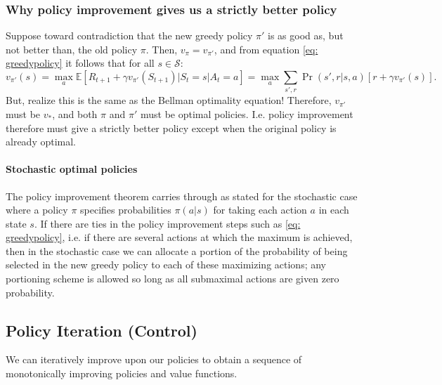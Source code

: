 \documentclass[12pt]{article}
\begin{document}
\subsubsection{Why policy improvement gives us a strictly better policy} Suppose toward contradiction that the new greedy policy $\pi'$ is as good as, but not better than, the old policy $\pi$. Then, $v_\pi = v_{\pi'}$, and from equation
\ref{eq: greedypolicy} it follows that for all $s \in \mathcal S$:
\[
  v_{\pi'}(s) = \max_a \mathbb E \left[R_{t+1} + \gamma v_{\pi'}(S_{t+1}) | S_t= s | A_t = a \right] = \max_a \sum_{s',r} \Pr(s',r|s,a)\left[r + \gamma v_{\pi'}(s)\right].
\]
But, realize this is the same as the Bellman optimality equation! Therefore, $v_{\pi'}$ must be $v_*$, and both $\pi$ and $\pi'$ must be optimal policies. I.e. policy improvement therefore must give a strictly better policy except when the original policy is already optimal.

\paragraph{Stochastic optimal policies} The policy improvement theorem carries through as stated for the stochastic case where a policy $\pi$ specifies probabilities $\pi(a|s)$ for taking each action $a$ in each state $s$. If there are ties in the policy improvement steps such as \ref{eq: greedypolicy}, i.e. if there are several actions at which the maximum is achieved, then in the stochastic case we can allocate a portion of the probability of being selected in the new greedy policy to each of these maximizing actions; any portioning scheme is allowed so long as all submaximal actions are given zero probability.

\subsection{Policy Iteration (Control)}
We can iteratively improve upon our policies to obtain a sequence of monotonically improving policies and value functions.
\end{document}
